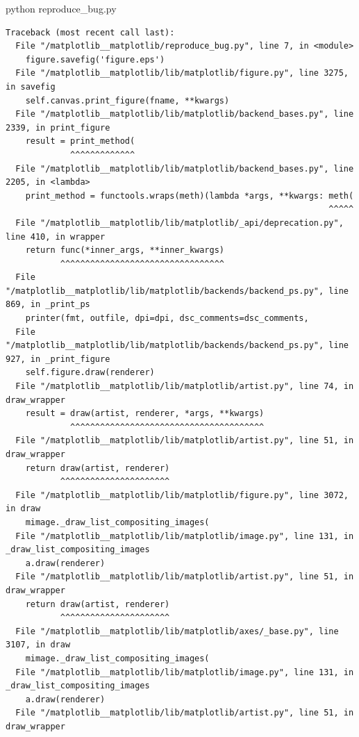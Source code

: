 {\begin{agentbox}
\hrulefill
\begin{CodeVerbatim}[breaklines=true, breakanywhere=true]
python reproduce_bug.py
\end{CodeVerbatim}
\end{agentbox}
\begin{observationbox}\begin{Verbatim}[breaklines=true, breakanywhere=true]
Traceback (most recent call last):
  File "/matplotlib__matplotlib/reproduce_bug.py", line 7, in <module>
    figure.savefig('figure.eps')
  File "/matplotlib__matplotlib/lib/matplotlib/figure.py", line 3275, in savefig
    self.canvas.print_figure(fname, **kwargs)
  File "/matplotlib__matplotlib/lib/matplotlib/backend_bases.py", line 2339, in print_figure
    result = print_method(
             ^^^^^^^^^^^^^
  File "/matplotlib__matplotlib/lib/matplotlib/backend_bases.py", line 2205, in <lambda>
    print_method = functools.wraps(meth)(lambda *args, **kwargs: meth(
                                                                 ^^^^^
  File "/matplotlib__matplotlib/lib/matplotlib/_api/deprecation.py", line 410, in wrapper
    return func(*inner_args, **inner_kwargs)
           ^^^^^^^^^^^^^^^^^^^^^^^^^^^^^^^^^
  File "/matplotlib__matplotlib/lib/matplotlib/backends/backend_ps.py", line 869, in _print_ps
    printer(fmt, outfile, dpi=dpi, dsc_comments=dsc_comments,
  File "/matplotlib__matplotlib/lib/matplotlib/backends/backend_ps.py", line 927, in _print_figure
    self.figure.draw(renderer)
  File "/matplotlib__matplotlib/lib/matplotlib/artist.py", line 74, in draw_wrapper
    result = draw(artist, renderer, *args, **kwargs)
             ^^^^^^^^^^^^^^^^^^^^^^^^^^^^^^^^^^^^^^^
  File "/matplotlib__matplotlib/lib/matplotlib/artist.py", line 51, in draw_wrapper
    return draw(artist, renderer)
           ^^^^^^^^^^^^^^^^^^^^^^
  File "/matplotlib__matplotlib/lib/matplotlib/figure.py", line 3072, in draw
    mimage._draw_list_compositing_images(
  File "/matplotlib__matplotlib/lib/matplotlib/image.py", line 131, in _draw_list_compositing_images
    a.draw(renderer)
  File "/matplotlib__matplotlib/lib/matplotlib/artist.py", line 51, in draw_wrapper
    return draw(artist, renderer)
           ^^^^^^^^^^^^^^^^^^^^^^
  File "/matplotlib__matplotlib/lib/matplotlib/axes/_base.py", line 3107, in draw
    mimage._draw_list_compositing_images(
  File "/matplotlib__matplotlib/lib/matplotlib/image.py", line 131, in _draw_list_compositing_images
    a.draw(renderer)
  File "/matplotlib__matplotlib/lib/matplotlib/artist.py", line 51, in draw_wrapper

\end{Verbatim}
\end{observationbox}}
